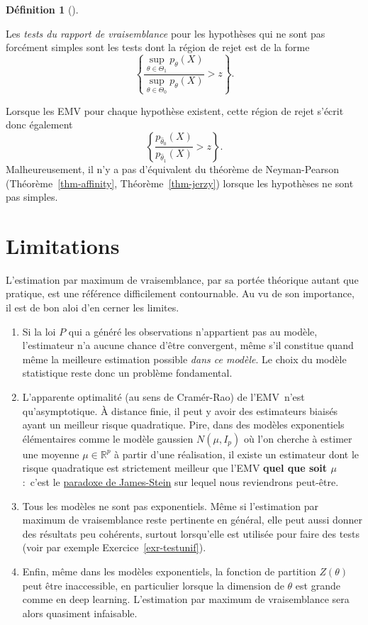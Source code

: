 \documentclass[
  10,
  letterpaper,
  DIV=11,
  numbers=noendperiod]{scrreport}
\theoremstyle{plain}
\theoremstyle{definition}
\theoremstyle{plain}
\theoremstyle{definition}
\newtheorem{definition}{Définition}[chapter]
\theoremstyle{definition}
\theoremstyle{plain}
\theoremstyle{remark}
\begin{document}
\begin{definition}[]\protect\hypertarget{def-testRVgen}{}\label{def-testRVgen}

Les \emph{tests du rapport de vraisemblance} pour les hypothèses qui ne
sont pas forcément simples sont les tests dont la région de rejet est de
la forme
\[ \left\lbrace\frac{\sup_{\theta \in \Theta_1}p_\theta(X)}{\sup_{\theta\in\Theta_0}p_\theta(X)} > z \right\rbrace. \]

\end{definition}

Lorsque les EMV pour chaque hypothèse existent, cette région de rejet
s'écrit donc également
\[ \left\lbrace \frac{p_{\hat{\theta}_0}(X)}{p_{\hat{\theta}_1}(X)} > z \right\rbrace. \]
Malheureusement, il n'y a pas d'équivalent du théorème de Neyman-Pearson
(Théorème~\ref{thm-affinity}, Théorème~\ref{thm-jerzy}) lorsque les
hypothèses ne sont pas simples.

\hypertarget{limitations}{%
\section{Limitations}\label{limitations}}

L'estimation par maximum de vraisemblance, par sa portée théorique
autant que pratique, est une référence difficilement contournable. Au vu
de son importance, il est de bon aloi d'en cerner les limites.

\begin{enumerate}
\def\labelenumi{\arabic{enumi}.}
\item
  Si la loi \(P\) qui a généré les observations n'appartient pas au
  modèle, l'estimateur n'a aucune chance d'être convergent, même s'il
  constitue quand même la meilleure estimation possible \emph{dans ce
  modèle}. Le choix du modèle statistique reste donc un problème
  fondamental.
\item
  L'apparente optimalité (au sens de Cramér-Rao) de l'EMV~n'est
  qu'asymptotique. À distance finie, il peut y avoir des estimateurs
  biaisés ayant un meilleur risque quadratique. Pire, dans des modèles
  exponentiels élémentaires comme le modèle gaussien \(N(\mu, I_p)\) où
  l'on cherche à estimer une moyenne \(\mu \in \mathbb{R}^p\) à partir
  d'une réalisation, il existe un estimateur dont le risque quadratique
  est strictement meilleur que l'EMV \textbf{quel que soit \(\mu\)}
  :~c'est le
  \href{https://fr.wikipedia.org/wiki/Paradoxe_de_Stein}{paradoxe de
  James-Stein} sur lequel nous reviendrons peut-être.
\item
  Tous les modèles ne sont pas exponentiels. Même si l'estimation par
  maximum de vraisemblance reste pertinente en général, elle peut aussi
  donner des résultats peu cohérents, surtout lorsqu'elle est utilisée
  pour faire des tests (voir par exemple Exercice~\ref{exr-testunif}).
\item
  Enfin, même dans les modèles exponentiels, la fonction de partition
  \(Z(\theta)\) peut être inaccessible, en particulier lorsque la
  dimension de \(\theta\) est grande comme en deep learning.
  L'estimation par maximum de vraisemblance sera alors quasiment
  infaisable.
\end{enumerate}
\end{document}
